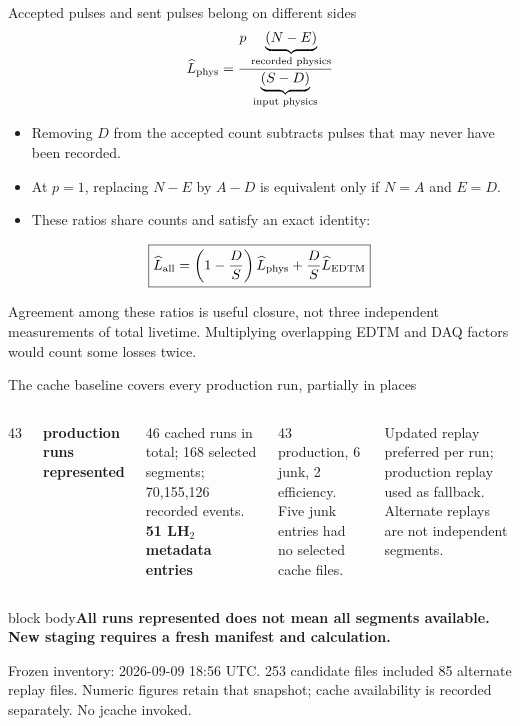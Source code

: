 \documentclass[aspectratio=169,11pt]{beamer}
\newcommand{\source}[1]{\par\vfill{\scriptsize\color{muted}#1\par}}
\newcommand{\takeaway}[1]{\begin{beamercolorbox}[sep=2.5mm,wd=\linewidth]{block body}\textbf{#1}\end{beamercolorbox}}
\newcommand{\Lp}{\widehat L_{\rm EDTM}}
\newcommand{\Lphys}{\widehat L_{\rm phys}}
\newcommand{\Lall}{\widehat L_{\rm all}}
\begin{document}
\begin{frame}{Accepted pulses and sent pulses belong on different sides}
\small
\[\Lphys=\frac{p\,\underbrace{(N-E)}_{\text{recorded physics}}}{\underbrace{(S-D)}_{\text{input physics}}}\]
\begin{itemize}\setlength\itemsep{2mm}
\item Removing $D$ from the accepted count subtracts pulses that may never have been recorded.
\item At $p=1$, replacing $N-E$ by $A-D$ is equivalent only if $N=A$ and $E=D$.
\item These ratios share counts and satisfy an exact identity:
\end{itemize}
\[\boxed{\Lall=\left(1-\frac{D}{S}\right)\Lphys+\frac{D}{S}\Lp}\]
\source{Agreement among these ratios is useful closure, not three independent measurements of total livetime. Multiplying overlapping EDTM and DAQ factors would count some losses twice.}
\end{frame}

\begin{frame}{The cache baseline covers every production run, partially in places}
\small
\begin{columns}[T]
{\Huge\color{teal}43}\par\textbf{production runs represented}\par\vspace{4mm}
46 cached runs in total; 168 selected segments; 70,155,126 recorded events.
\textbf{51 LH$_2$ metadata entries}\par
43 production, 6 junk, 2 efficiency. Five junk entries had no selected cache files.
\vspace{4mm}\par Updated replay preferred per run; production replay used as fallback. Alternate replays are not independent segments.
\end{columns}
\vspace{2mm}\takeaway{All runs represented does not mean all segments available. New staging requires a fresh manifest and calculation.}
\source{Frozen inventory: 2026-09-09 18:56 UTC. 253 candidate files included 85 alternate replay files. Numeric figures retain that snapshot; cache availability is recorded separately. No jcache invoked.}
\end{frame}
\end{document}
